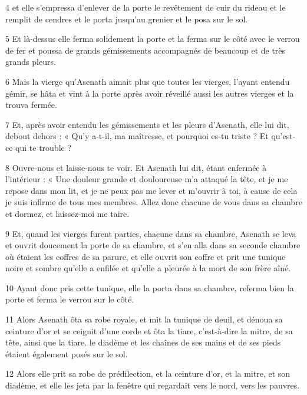 \par 4 et elle s'empressa d'enlever de la porte le revêtement de cuir du rideau et le remplit de cendres et le porta jusqu'au grenier et le posa sur le sol.

\par 5 Et là-dessus elle ferma solidement la porte et la ferma sur le côté avec le verrou de fer et poussa de grands gémissements accompagnés de beaucoup et de très grands pleurs.

\par 6 Mais la vierge qu'Asenath aimait plus que toutes les vierges, l'ayant entendu gémir, se hâta et vint à la porte après avoir réveillé aussi les autres vierges et la trouva fermée.

\par 7 Et, après avoir entendu les gémissements et les pleurs d'Asenath, elle lui dit, debout dehors : « Qu'y a-t-il, ma maîtresse, et pourquoi es-tu triste ? Et qu'est-ce qui te trouble ?

\par 8 Ouvre-nous et laisse-nous te voir. Et Asenath lui dit, étant enfermée à l'intérieur : « Une douleur grande et douloureuse m'a attaqué la tête, et je me repose dans mon lit, et je ne peux pas me lever et m'ouvrir à toi, à cause de cela je suis infirme de tous mes membres. Allez donc chacune de vous dans sa chambre et dormez, et laissez-moi me taire.

\par 9 Et, quand les vierges furent parties, chacune dans sa chambre, Asenath se leva et ouvrit doucement la porte de sa chambre, et s'en alla dans sa seconde chambre où étaient les coffres de sa parure, et elle ouvrit son coffre et prit une tunique noire et sombre qu'elle a enfilée et qu'elle a pleurée à la mort de son frère aîné.

\par 10 Ayant donc pris cette tunique, elle la porta dans sa chambre, referma bien la porte et ferma le verrou sur le côté.

\par 11 Alors Asenath ôta sa robe royale, et mit la tunique de deuil, et dénoua sa ceinture d'or et se ceignit d'une corde et ôta la tiare, c'est-à-dire la mitre, de sa tête, ainsi que la tiare. le diadème et les chaînes de ses mains et de ses pieds étaient également posés sur le sol.

\par 12 Alors elle prit sa robe de prédilection, et la ceinture d'or, et la mitre, et son diadème, et elle les jeta par la fenêtre qui regardait vers le nord, vers les pauvres.

